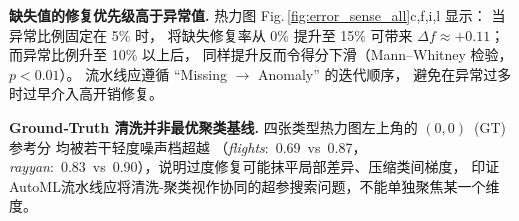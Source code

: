 \documentclass[10pt]{article} %
\numberwithin{equation}{section}
\begin{document}
\medskip
\noindent%
\textbf{缺失值的修复优先级高于异常值.}\;
热力图 Fig.\,\ref{fig:error_sense_all}\hspace{0.05em}c,f,i,l 显示：
当异常比例固定在 5\% 时，
将缺失修复率从 0\% 提升至 15\% 可带来
\(\Delta f\approx+0.11\)；
而异常比例升至 10\% 以上后，
同样提升反而令得分下滑（Mann–Whitney 检验，\(p<0.01\)）。
流水线应遵循 “Missing \(\rightarrow\) Anomaly” 的迭代顺序，
避免在异常过多时过早介入高开销修复。

\medskip
\noindent%
\textbf{Ground‑Truth 清洗并非最优聚类基线.}\;
四张类型热力图左上角的 \((0,0)\) (GT) 参考分
均被若干轻度噪声档超越
（\textit{flights}: 0.69 vs 0.87，\textit{rayyan}: 0.83 vs 0.90），说明过度修复可能抹平局部差异、压缩类间梯度，
印证AutoML流水线应将清洗-聚类视作协同的超参搜索问题，不能单独聚焦某一个维度。

\end{document}
